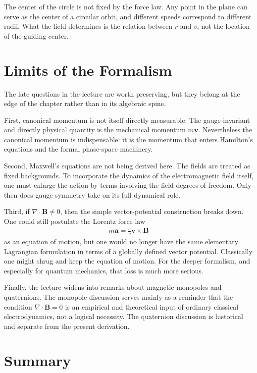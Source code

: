 The center of the circle is not fixed by the force law. Any point in the plane can serve as the center of a circular orbit, and different speeds correspond to different radii. What the field determines is the relation between \(r\) and \(v\), not the location of the guiding center.

\section{Limits of the Formalism}

The late questions in the lecture are worth preserving, but they belong at the edge of the chapter rather than in its algebraic spine.

First, canonical momentum is not itself directly measurable. The gauge-invariant and directly physical quantity is the mechanical momentum \(m\mathbf v\). Nevertheless the canonical momentum is indispensable: it is the momentum that enters Hamilton's equations and the formal phase-space machinery.

Second, Maxwell's equations are not being derived here. The fields are treated as fixed backgrounds. To incorporate the dynamics of the electromagnetic field itself, one must enlarge the action by terms involving the field degrees of freedom. Only then does gauge symmetry take on its full dynamical role.

Third, if \(\nabla\!\cdot\!\mathbf B\neq 0\), then the simple vector-potential construction breaks down. One could still postulate the Lorentz force law
\begin{align}
m\mathbf a=\frac{e}{c}\mathbf v\times\mathbf B
\end{align}
as an equation of motion, but one would no longer have the same elementary Lagrangian formulation in terms of a globally defined vector potential. Classically one might shrug and keep the equation of motion. For the deeper formalism, and especially for quantum mechanics, that loss is much more serious.

Finally, the lecture widens into remarks about magnetic monopoles and quaternions. The monopole discussion serves mainly as a reminder that the condition \(\nabla\!\cdot\!\mathbf B=0\) is an empirical and theoretical input of ordinary classical electrodynamics, not a logical necessity. The quaternion discussion is historical and separate from the present derivation.

\section{Summary}

